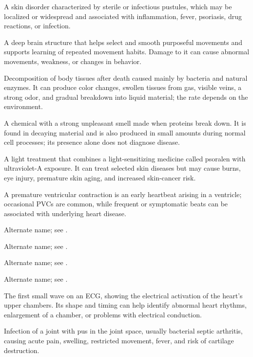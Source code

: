 A skin disorder characterized by sterile or infectious pustules, which may be localized or widespread and associated with inflammation, fever, psoriasis, drug reactions, or infection.

 A deep brain structure that helps select and smooth purposeful movements and supports learning of repeated movement habits. Damage to it can cause abnormal movements, weakness, or changes in behavior.

 Decomposition of body tissues after death caused mainly by bacteria and natural enzymes. It can produce color changes, swollen tissues from gas, visible veins, a strong odor, and gradual breakdown into liquid material; the rate depends on the environment.

 A chemical with a strong unpleasant smell made when proteins break down. It is found in decaying material and is also produced in small amounts during normal cell processes; its presence alone does not diagnose disease.

 A light treatment that combines a light-sensitizing medicine called psoralen with ultraviolet-A exposure. It can treat selected skin diseases but may cause burns, eye injury, premature skin aging, and increased skin-cancer risk.

 A premature ventricular contraction is an early heartbeat arising in a ventricle; occasional PVCs are common, while frequent or symptomatic beats can be associated with underlying heart disease.

 Alternate name; see .

 Alternate name; see .

 Alternate name; see .

 Alternate name; see .

 The first small wave on an ECG, showing the electrical activation of the heart’s upper chambers. Its shape and timing can help identify abnormal heart rhythms, enlargement of a chamber, or problems with electrical conduction.

 Infection of a joint with pus in the joint space, usually bacterial septic arthritis, causing acute pain, swelling, restricted movement, fever, and risk of cartilage destruction.

